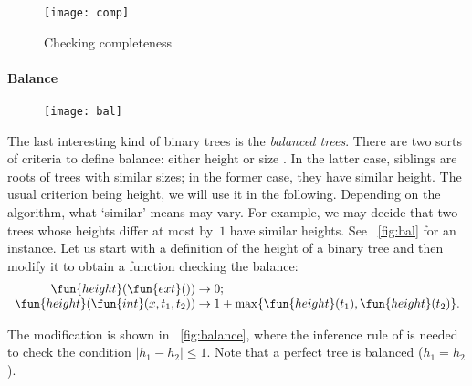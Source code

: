 \bigskip

\begin{figure}[H]
\centering
\texttt{[image: comp]}
\caption{Checking completeness}
\label{fig:comp}
\end{figure}

\paragraph{Balance}

\begin{wrapfigure}[7]{r}[0pt]{0pt}
\centering
\texttt{[image: bal]}
\caption{}
\label{fig:bal}
\end{wrapfigure}
The last interesting kind of binary trees is the \emph{balanced
  trees}. There are two sorts of
criteria to define balance: either height or size
\citep{NievergeltReingold_1972,HiraiYamamoto_2011}. In the latter
case, siblings are roots of trees with similar sizes; in the former
case, they have similar height. The usual criterion being height, we
will use it in the following. Depending on the algorithm, what
`similar' means may vary. For example, we may decide that two trees
whose heights differ at most by~\(1\) have similar heights. See
\fig~\vref{fig:bal} for an instance. Let us start with a definition of
the height of a
binary tree and then modify it to obtain a function checking the
balance:
\begin{equation*}
\begin{array}{r@{\;}c@{\;}l}
\fun{height}(\fun{ext}()) & \rightarrow & 0;\\
\fun{height}(\fun{int}(x,t_1,t_2)) & \rightarrow & 1 +
\max\{\fun{height}(t_1), \fun{height}(t_2)\}.
\end{array}
\end{equation*}

The modification is shown in \fig~\vref{fig:balance}, where the
inference rule of  is
needed to check the condition \(|h_1 - h_2| \leqslant 1\). Note that a
perfect tree is balanced (\(h_1 = h_2\)).

\bigskip

